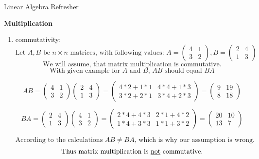\documentclass[
	english,
        solution=true
	]{tudaexercise}
\begin{document}
\begin{task}[points=28]{Linear Algebra Refresher}
\begin{subtask}[points=5,title=Matrix Properties]
\begin{solution}
\textbf{Multiplication}

\begin{enumerate}
    \item commutativity:
        \[\text{Let } A, B \text{ be }n\times n \text{ matrices, with following values: } A=\begin{pmatrix}
            4 & 1 \\ 3 & 2
        \end{pmatrix}, B=\begin{pmatrix}
            2 & 4 \\1 & 3
        \end{pmatrix}\]
        \[\text{We will assume, that matrix multiplication is commutative.}\]
        \[\text{With given example for $A$ and $B$, $AB$ should equal $BA$}\]
        
        \[AB = \begin{pmatrix}
            4 & 1 \\ 3 & 2
        \end{pmatrix} \begin{pmatrix}
            2 & 4 \\ 1 & 3
        \end{pmatrix}=\begin{pmatrix}
            4*2+1*1 & 4*4+1*3 \\ 3*2+2*1 & 3*4+2*3
        \end{pmatrix}=\begin{pmatrix}
            9 & 19 \\ 8 & 18
        \end{pmatrix}\]

        \[BA = \begin{pmatrix}
            2 & 4 \\ 1 & 3
        \end{pmatrix} \begin{pmatrix}
            4 & 1 \\ 3 & 2
        \end{pmatrix}=\begin{pmatrix}
           2*4+4*3  & 2*1+4*2 \\ 1*4+3*3 & 1*1+3*2 
        \end{pmatrix}=\begin{pmatrix}
           20  & 10 \\ 13 & 7
        \end{pmatrix}\]

        \[\text{According to the calculations $AB\ne BA$, which is why our assumption is wrong.}\]
        \[ \text{Thus matrix multiplication is \underline{not} commutative.}\]


\end{enumerate}
\end{solution}
\end{subtask}
\end{task}
\end{document}
